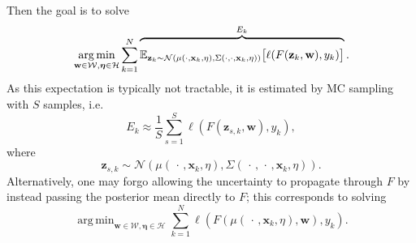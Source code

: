 \documentclass{article}
\DeclareMathOperator*{\argmin}{arg\,min}
\newcommand{\reals}{\mathbb{R}}
\newcommand{\sig}{\mathrm{Sig}^N}
\begin{document}
Then the goal is to solve
\begin{equation}\label{eq:gp-mc}
\argmin_{\mathbf{w} \in \mathcal{W},\bm{\eta} \in \mathcal{H}} \sum_{k=1}^N \overbrace{\rule{0pt}{0.5cm} \mathbb{E}_{\mathbf{z}_k \sim \mathcal{N}\left( \mu(\cdot, \mathbf{x}_k, \eta), \Sigma(\cdot, \cdot, \mathbf{x}_k, \eta)\right) } \big[ \ell(F(\mathbf{z}_k, \mathbf{w}),
y_k) \big] }^{\text{$E_k$}}.
\end{equation}
%
As this expectation is typically not tractable, it is estimated by MC
sampling with $S$ samples, i.e.\
%
\begin{equation}
E_k \approx \frac{1}{S} \sum_{s=1}^{S} \ell(F(\mathbf{z}_{s, k}, \mathbf{w}), y_k),
\end{equation}
%
where
\begin{equation}
    \mathbf{z}_{s, k} \sim \mathcal{N}\left( \mu(\,\cdot\,, \mathbf{x}_k, \eta), \Sigma(\,\cdot\,, \,\cdot\,, \mathbf{x}_k, \eta)\right).
\end{equation}
%
Alternatively, one may forgo allowing the uncertainty to propagate through $F$ by instead passing the posterior mean directly to $F$; this corresponds to solving
\begin{equation}\label{eq:gp-mean}
  \argmin_{\mathbf{w} \in \mathcal{W},\bm{\eta} \in \mathcal{H}} \sum_{k=1}^N \ell(F(\mu(\,\cdot\,,\mathbf{x}_k, \eta), \mathbf{w}), y_k).
\end{equation}




\end{document}
